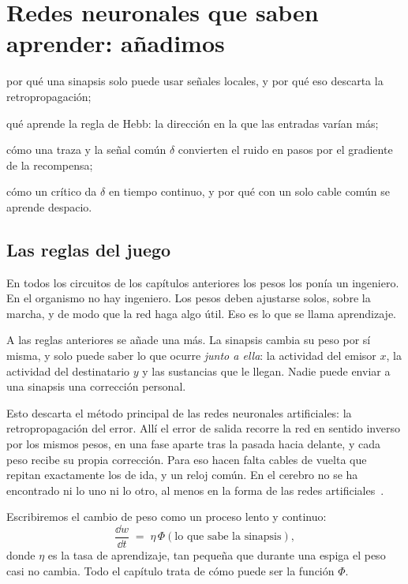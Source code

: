 \chapter{Redes neuronales que saben aprender: añadimos }
\label{sec:dofa}
\begin{chaptergoals}
\item por qué una sinapsis solo puede usar señales locales, y por qué eso descarta la retropropagación;
\item qué aprende la regla de Hebb: la dirección en la que las entradas varían más;
\item cómo una traza y la señal común $\delta$ convierten el ruido en pasos por el gradiente de la recompensa;
\item cómo un crítico da $\delta$ en tiempo continuo, y por qué con un solo cable común se aprende despacio.
\end{chaptergoals}

\section{Las reglas del juego}

En todos los circuitos de los capítulos anteriores los pesos los ponía un ingeniero. En el organismo no hay ingeniero. Los pesos deben ajustarse solos, sobre la marcha, y de modo que la red haga algo útil. Eso es lo que se llama aprendizaje.

A las reglas anteriores se añade una más. La sinapsis cambia su peso por sí misma, y solo puede saber lo que ocurre \emph{junto a ella}: la actividad del emisor $x$, la actividad del destinatario $y$ y las sustancias que le llegan. Nadie puede enviar a una sinapsis una corrección personal.

Esto descarta el método principal de las redes neuronales artificiales: la retropropagación del error. Allí el error de salida recorre la red en sentido inverso por los mismos pesos, en una fase aparte tras la pasada hacia delante, y cada peso recibe su propia corrección. Para eso hacen falta cables de vuelta que repitan exactamente los de ida, y un reloj común. En el cerebro no se ha encontrado ni lo uno ni lo otro, al menos en la forma de las redes artificiales~\cite{Lillicrap2020,WhittingtonBogacz2019}.

Escribiremos el cambio de peso como un proceso lento y continuo:
\begin{equation}
\frac{\dd w}{\dd t} \;=\; \eta\,\Phi(\text{lo que sabe la sinapsis}),
\label{eq:plasticity}
\end{equation}
donde $\eta$ es la tasa de aprendizaje, tan pequeña que durante una espiga el peso casi no cambia. Todo el capítulo trata de cómo puede ser la función $\Phi$.

